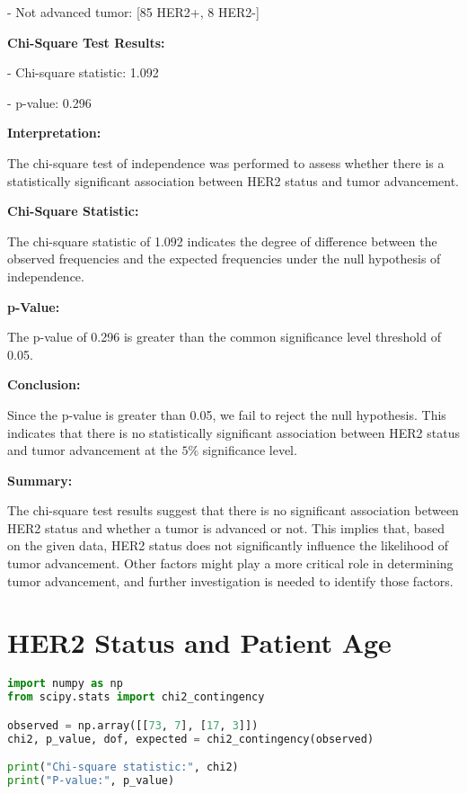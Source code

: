 \documentclass[12 px]{article}
\begin{document}
  - Not advanced tumor: [85 HER2+, 8 HER2-]

\textbf{Chi-Square Test Results:}

- Chi-square statistic: 1.092

- p-value: 0.296


\textbf{Interpretation:}

The chi-square test of independence was performed to assess whether there is 
a statistically significant association between HER2 status and tumor advancement.


\textbf{Chi-Square Statistic:}

The chi-square statistic of 1.092 indicates the degree of difference between the observed frequencies and the expected frequencies under the null hypothesis of independence.

\textbf{p-Value:}
 
The p-value of 0.296 is greater than the common significance level threshold of 0.05.

\textbf{Conclusion:}

Since the p-value is greater than 0.05, we fail to reject the null hypothesis. This indicates that there is no statistically significant association between HER2 status and tumor advancement at the $5\%$ significance level.
            
\textbf{Summary:}

The chi-square test results suggest that there is no significant association 
between HER2 status and whether a tumor is advanced or not. This implies that,
based on the given data, HER2 status does not significantly influence the 
likelihood of tumor advancement. Other factors might play a more critical 
role in determining tumor advancement, and further investigation is 
needed to identify those factors.





\section*{HER2 Status and Patient Age}

\begin{lstlisting}[language=Python, breaklines=true]
import numpy as np
from scipy.stats import chi2_contingency

observed = np.array([[73, 7], [17, 3]])
chi2, p_value, dof, expected = chi2_contingency(observed)

print("Chi-square statistic:", chi2)
print("P-value:", p_value)
      
\end{lstlisting}
\end{document}

